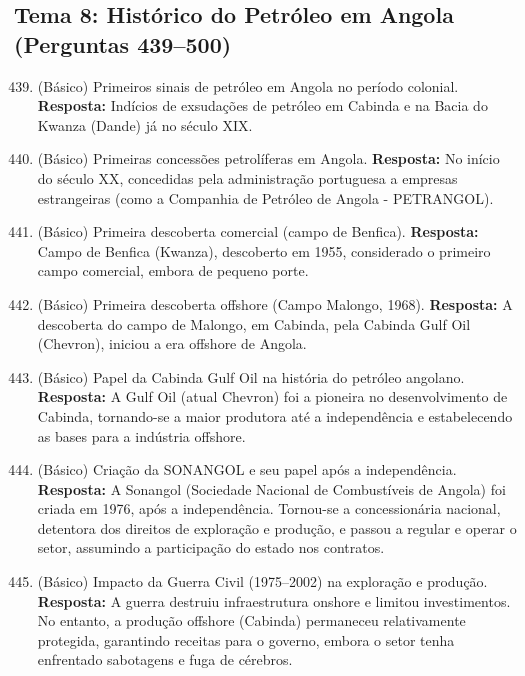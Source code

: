 \documentclass[11pt,a4paper]{article}
\begin{document}
\newpage

\subsection*{Tema 8: Histórico do Petróleo em Angola (Perguntas 439–500)}

\begin{enumerate}
  \setcounter{enumi}{438}
  \item (Básico) Primeiros sinais de petróleo em Angola no período colonial.
  \textbf{Resposta:} Indícios de exsudações de petróleo em Cabinda e na Bacia do Kwanza (Dande) já no século XIX.

  \item (Básico) Primeiras concessões petrolíferas em Angola.
  \textbf{Resposta:} No início do século XX, concedidas pela administração portuguesa a empresas estrangeiras (como a Companhia de Petróleo de Angola - PETRANGOL).

  \item (Básico) Primeira descoberta comercial (campo de Benfica).
  \textbf{Resposta:} Campo de Benfica (Kwanza), descoberto em 1955, considerado o primeiro campo comercial, embora de pequeno porte.

  \item (Básico) Primeira descoberta offshore (Campo Malongo, 1968).
  \textbf{Resposta:} A descoberta do campo de Malongo, em Cabinda, pela Cabinda Gulf Oil (Chevron), iniciou a era offshore de Angola.

  \item (Básico) Papel da Cabinda Gulf Oil na história do petróleo angolano.
  \textbf{Resposta:} A Gulf Oil (atual Chevron) foi a pioneira no desenvolvimento de Cabinda, tornando-se a maior produtora até a independência e estabelecendo as bases para a indústria offshore.

  \item (Básico) Criação da SONANGOL e seu papel após a independência.
  \textbf{Resposta:} A Sonangol (Sociedade Nacional de Combustíveis de Angola) foi criada em 1976, após a independência. Tornou-se a concessionária nacional, detentora dos direitos de exploração e produção, e passou a regular e operar o setor, assumindo a participação do estado nos contratos.

  \item (Básico) Impacto da Guerra Civil (1975–2002) na exploração e produção.
  \textbf{Resposta:} A guerra destruiu infraestrutura onshore e limitou investimentos. No entanto, a produção offshore (Cabinda) permaneceu relativamente protegida, garantindo receitas para o governo, embora o setor tenha enfrentado sabotagens e fuga de cérebros.


\end{enumerate}
\end{document}
